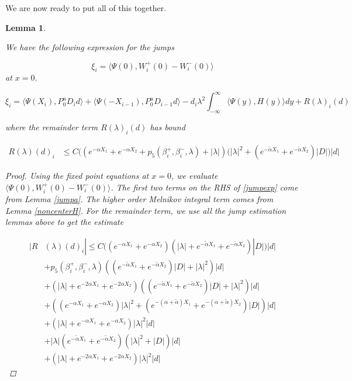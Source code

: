 \documentclass[12pt]{article}
\newtheorem{lemma}{Lemma}
\begin{document}
We are now ready to put all of this together.


\begin{lemma}\label{jump}

We have the following expression for the jumps 

\[
\xi_i = \langle \Psi(0), W_i^+(0) - W_i^-(0) \rangle
\]
at $x = 0$.

\begin{equation}\label{jumpexp}
\xi_i = \langle \Psi(X_i), P^u_0 D_i d \rangle + \langle \Psi(-X_{i-1}), P^u_0 D_{i-1} d \rangle - d_i \lambda^2 \int_{-\infty}^\infty \langle \Psi(y), H(y) \rangle dy + R(\lambda)_i(d)
\end{equation}

where the remainder term $R(\lambda)_i(d)$ has bound

\begin{align*}
R(\lambda)(d)_i &\leq C \Big( ( e^{-\alpha X_1} + e^{-\alpha X_2} + p_5(\beta_i^+, \beta_i^-, \lambda) + |\lambda| )(|\lambda|^2 + (e^{-\tilde{\alpha}X_1} + e^{-\tilde{\alpha}X_2}) |D|\Big) |d|
\end{align*}

\begin{proof}
Using the fixed point equations at $x = 0$, we evaluate $\langle \Psi(0), W_i^+(0) - W_i^-(0) \rangle$. The first two terms on the RHS of \eqref{jumpexp} come from Lemma \ref{jumpa}. The higher order Melnikov integral term comes from Lemma \ref{noncenterH}. For the remainder term, we use all the jump estimation lemmas above to get the estimate

\begin{align*}
|R&(\lambda)(d)_i| \leq C \Big( (e^{-\alpha X_1} + e^{-\alpha X_2})
( |\lambda| + e^{-\tilde{\alpha} X_1} + e^{-\tilde{\alpha} X_2}) |D| ) |d| \\
&+ p_5(\beta_i^+, \beta_i^-, \lambda) ( (e^{-\tilde{\alpha} X_1} + e^{-\tilde{\alpha} X_2}) |D| + |\lambda|^2 )|d| \\
&+ (|\lambda| + e^{-2 \alpha X_1} + e^{-2 \alpha X_2})( (e^{-\tilde{\alpha} X_1} + e^{-\tilde{\alpha} X_2}) |D| + |\lambda|^2 )|d| \\
&+ ( (e^{-\alpha X_1} + e^{-\alpha X_2}) |\lambda|^2 + (e^{-(\alpha + \tilde{\alpha}) X_1} + e^{-(\alpha + \tilde{\alpha}) X_2}) |D|) |d| \\
&+ ( |\lambda| + e^{-\alpha X_1} + e^{-\alpha X_2}) |\lambda|^2 |d| \\
&+ |\lambda| ( e^{-\tilde{\alpha} X_1} + e^{-\tilde{\alpha} X_2})(|\lambda|^2 + |D|) |d| \\
&+ (|\lambda| + e^{-2 \alpha X_1} + e^{-2 \alpha X_2} ) |\lambda|^2  |d|
\end{align*}


\end{proof}
\end{lemma}
\end{document}
